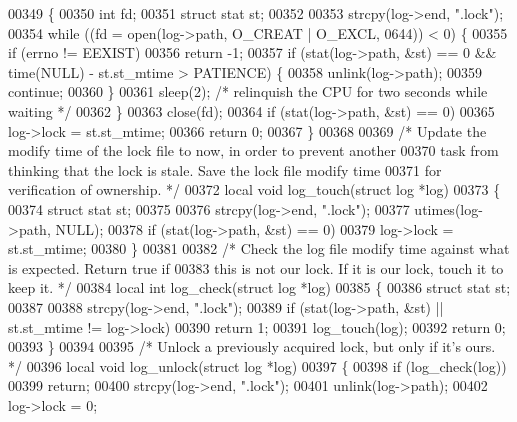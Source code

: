 \begin{DoxyCode}
00349 \{
00350     \textcolor{keywordtype}{int} fd;
00351     \textcolor{keyword}{struct }stat st;
00352 
00353     strcpy(log->end, \textcolor{stringliteral}{".lock"});
00354     \textcolor{keywordflow}{while} ((fd = open(log->path, O\_CREAT | O\_EXCL, 0644)) < 0) \{
00355         \textcolor{keywordflow}{if} (errno != EEXIST)
00356             \textcolor{keywordflow}{return} -1;
00357         \textcolor{keywordflow}{if} (stat(log->path, &st) == 0 && time(NULL) - st.st\_mtime > PATIENCE) \{
00358             unlink(log->path);
00359             \textcolor{keywordflow}{continue};
00360         \}
00361         sleep(2);       \textcolor{comment}{/* relinquish the CPU for two seconds while waiting */}
00362     \}
00363     close(fd);
00364     \textcolor{keywordflow}{if} (stat(log->path, &st) == 0)
00365         log->lock = st.st\_mtime;
00366     \textcolor{keywordflow}{return} 0;
00367 \}
00368 
00369 \textcolor{comment}{/* Update the modify time of the lock file to now, in order to prevent another}
00370 \textcolor{comment}{   task from thinking that the lock is stale.  Save the lock file modify time}
00371 \textcolor{comment}{   for verification of ownership. */}
00372 local \textcolor{keywordtype}{void} log\_touch(\textcolor{keyword}{struct} log *log)
00373 \{
00374     \textcolor{keyword}{struct }stat st;
00375 
00376     strcpy(log->end, \textcolor{stringliteral}{".lock"});
00377     utimes(log->path, NULL);
00378     \textcolor{keywordflow}{if} (stat(log->path, &st) == 0)
00379         log->lock = st.st\_mtime;
00380 \}
00381 
00382 \textcolor{comment}{/* Check the log file modify time against what is expected.  Return true if}
00383 \textcolor{comment}{   this is not our lock.  If it is our lock, touch it to keep it. */}
00384 local \textcolor{keywordtype}{int} log\_check(\textcolor{keyword}{struct} log *log)
00385 \{
00386     \textcolor{keyword}{struct }stat st;
00387 
00388     strcpy(log->end, \textcolor{stringliteral}{".lock"});
00389     \textcolor{keywordflow}{if} (stat(log->path, &st) || st.st\_mtime != log->lock)
00390         \textcolor{keywordflow}{return} 1;
00391     log\_touch(log);
00392     \textcolor{keywordflow}{return} 0;
00393 \}
00394 
00395 \textcolor{comment}{/* Unlock a previously acquired lock, but only if it's ours. */}
00396 local \textcolor{keywordtype}{void} log\_unlock(\textcolor{keyword}{struct} log *log)
00397 \{
00398     \textcolor{keywordflow}{if} (log\_check(log))
00399         \textcolor{keywordflow}{return};
00400     strcpy(log->end, \textcolor{stringliteral}{".lock"});
00401     unlink(log->path);
00402     log->lock = 0;

\end{DoxyCode}
